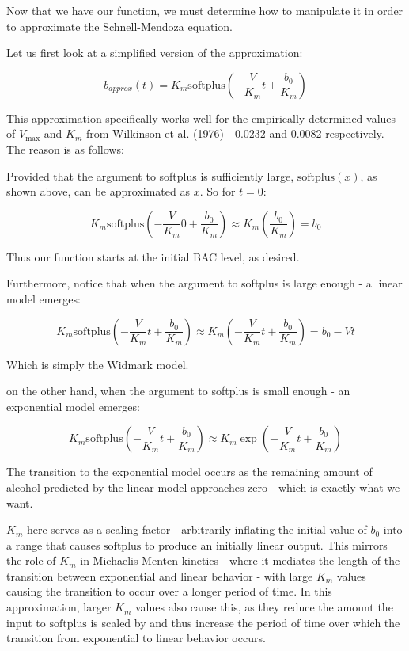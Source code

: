 \documentclass[12pt]{article}
\begin{document}
Now that we have our function, we must determine how to manipulate it in order to approximate the Schnell-Mendoza equation.

Let us first look at a simplified version of the approximation:

\[
    b_{approx}(t) = K_m\mathrm{softplus}(-\frac{V}{K_m}t + \frac{b_0}{K_m})
\]

This approximation specifically works well for the empirically determined values of $V_{\text{max}}$ and $K_m$ from Wilkinson et al. (1976) - 0.0232 and 0.0082 respectively. The reason is as follows:

Provided that the argument to softplus is sufficiently large, $\mathrm{softplus}(x)$, as shown above, can be approximated as $x$. So for $t = 0$:

\[
    K_m\mathrm{softplus}(-\frac{V}{K_m}{0} + \frac{b_0}{K_m}) \approx K_m( \frac{b_0}{K_m}) = b_0
\]

Thus our function starts at the initial BAC level, as desired.

Furthermore, notice that when the argument to softplus is large enough - a linear model emerges:

\[
    K_m\mathrm{softplus}(-\frac{V}{K_m}t + \frac{b_0}{K_m}) \approx K_m(-\frac{V}{K_m}t + \frac{b_0}{K_m}) = b_0 - Vt
\]

Which is simply the Widmark model.

on the other hand, when the argument to softplus is small enough - an exponential model emerges:

\[
    K_m\mathrm{softplus}(-\frac{V}{K_m}t + \frac{b_0}{K_m}) \approx K_m\exp(-\frac{V}{K_m}t + \frac{b_0}{K_m})
\]

The transition to the exponential model occurs as the remaining amount of alcohol predicted by the linear model approaches zero - which is exactly what we want.

$K_m$ here serves as a scaling factor - arbitrarily inflating the initial value of $b_0$ into a range that causes $\mathrm{softplus}$ to produce an initially linear output. This mirrors the role of $K_m$ in Michaelis-Menten kinetics - where it mediates the length of the transition between exponential and linear behavior - with large $K_m$ values causing the transition to occur over a longer period of time. In this approximation, larger $K_m$ values also cause this, as they reduce the amount the input to $\mathrm{softplus}$ is scaled by and thus increase the period of time over which the transition from exponential to linear behavior occurs.
\end{document}
